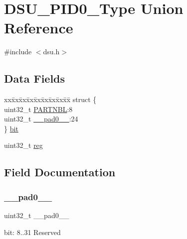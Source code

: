 \hypertarget{union_d_s_u___p_i_d0___type}{}\section{D\+S\+U\+\_\+\+P\+I\+D0\+\_\+\+Type Union Reference}
\label{union_d_s_u___p_i_d0___type}


{\ttfamily \#include $<$dsu.\+h$>$}

\subsection*{Data Fields}
\begin{DoxyCompactItemize}
\item 
\begin{tabbing}
xx\=xx\=xx\=xx\=xx\=xx\=xx\=xx\=xx\=\kill
struct \{\\
\>uint32\_t \mbox{\hyperlink{union_d_s_u___p_i_d0___type_a97838df28c1bc21b366053f3b09102f5}{PARTNBL}}:8\\
\>uint32\_t \mbox{\hyperlink{union_d_s_u___p_i_d0___type_a3e57c2ef1c3ffb36722f000cc1156824}{\_\_pad0\_\_}}:24\\
\} \mbox{\hyperlink{union_d_s_u___p_i_d0___type_af79a7416878261d30938ba17d4b7ee78}{bit}}\\

\end{tabbing}\item 
uint32\+\_\+t \mbox{\hyperlink{union_d_s_u___p_i_d0___type_a6b91636401516a477989a336376d7b40}{reg}}
\end{DoxyCompactItemize}


\subsection{Field Documentation}
\mbox{\label{union_d_s_u___p_i_d0___type_a3e57c2ef1c3ffb36722f000cc1156824}} 
\subsubsection{\texorpdfstring{\_\_pad0\_\_}{\_\_pad0\_\_}}
{\footnotesize\ttfamily uint32\+\_\+t \+\_\+\+\_\+pad0\+\_\+\+\_\+}

bit\+: 8..31 Reserved \mbox{\label{union_d_s_u___p_i_d0___type_af79a7416878261d30938ba17d4b7ee78}} 
